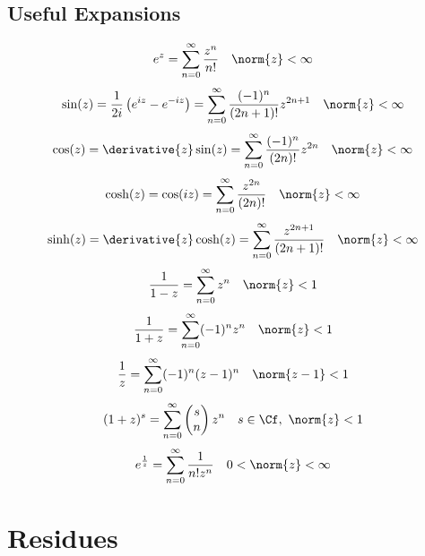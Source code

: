 \documentclass[../mmf.tex]{subfiles}
\begin{document}
\subsection{Useful Expansions}
\begin{equation}
	e^z=\sum_{n=0}^\infty\frac{z^n}{n!}\quad\norm{z}<\infty
	\label{eq:expser}
\end{equation}
\begin{equation}
	\sin(z)=\frac{1}{2i}\left( e^{iz}-e^{-iz} \right)=\sum_{n=0}^{\infty}\frac{(-1)^n}{(2n+1)!}z^{2n+1}\quad\norm{z}<\infty
	\label{eq:sinser}
\end{equation}
\begin{equation}
	\cos(z)=\derivative{z}\sin(z)=\sum_{n=0}^{\infty}\frac{(-1)^n}{(2n)!}z^{2n}\quad\norm{z}<\infty
	\label{eq:cosser}
\end{equation}
\begin{equation}
	\cosh(z)=\cos(iz)=\sum_{n=0}^{\infty}\frac{z^{2n}}{(2n)!}\quad\norm{z}<\infty
	\label{eq:coshser}
\end{equation}
\begin{equation}
	\sinh(z)=\derivative{z}\cosh(z)=\sum_{n=0}^{\infty}\frac{z^{2n+1}}{(2n+1)!}\quad\norm{z}<\infty
	\label{eq:sinhser}
\end{equation}
\begin{equation}
	\frac{1}{1-z}=\sum_{n=0}^{\infty}z^n\quad\norm{z}<1
	\label{eq:geomser}
\end{equation}
\begin{equation}
	\frac{1}{1+z}=\sum_{n=0}^{\infty}(-1)^nz^n\quad\norm{z}<1
	\label{eq:geomminoneser}
\end{equation}
\begin{equation}
	\frac{1}{z}=\sum_{n=0}^{\infty}(-1)^n(z-1)^n\quad\norm{z-1}<1
	\label{eq:zminoneser}
\end{equation}
\begin{equation}
	(1+z)^s=\sum_{n=0}^{\infty}\begin{pmatrix}s\\n\end{pmatrix}z^n\quad s\in\Cf,\ \norm{z}<1
	\label{eq:binomser}
\end{equation}
\begin{equation}
	e^{\frac{1}{z}}=\sum_{n=0}^{\infty}\frac{1}{n!z^n}\quad0<\norm{z}<\infty
	\label{eq:explaur}
\end{equation}
\section{Residues}
\end{document}
